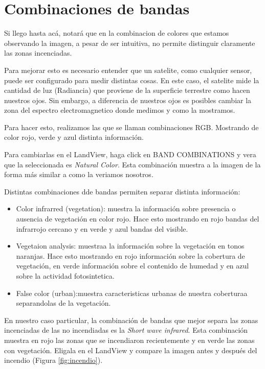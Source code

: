 \documentclass[a4paper,12pt]{book}
\begin{document}
\chapter{Combinaciones de bandas}
Si llego hasta acá, notará que en la combinacion de colores que estamos observando la imagen, a pesar de ser intuitiva, no permite distinguir claramente las zonas incenciadas.

Para mejorar esto es necesario entender que un satelite, como cualquier sensor, puede ser configurado para medir distintas cosas. En este caso, el satelite mide la cantidad de luz (Radiancia) que proviene de la superficie terrestre como hacen nuestros ojos. Sin embargo, a diferencia de nuestros ojos es posibles cambiar la zona del espectro electromagnetico donde medimos y como la mostramos.

Para hacer esto, realizamos las que se llaman combinaciones RGB. Mostrando de color rojo, verde y azul distinta información.

Para cambiarlas en el LandView, haga click en BAND COMBINATIONS y vera que la seleccionada es \emph{Natural Color}. Esta combinación muestra a la imagen de la forma más similar a como la veriamos nosotros.

Distintas combinaciones dde bandas permiten separar distinta información:

\begin{itemize}
    \item Color infrarred (vegetation): muestra la información sobre presencia o ausencia de vegetación en color rojo. Hace esto mostrando en rojo bandas del infrarrojo cercano y en verde y azul bandas del visible.
    \item Vegetaion analysis: muestraa la información sobre la vegetación en tonos naranjas. Hace esto mostrando en rojo información sobre la cobertura de vegetación, en verde información sobre el contenido de humedad y en azul sobre la actividad fotosintetica.
    \item False color (urban):muestra caracteristicas urbanas de nuestra coberturaa separandolas de la vegetación.
\end{itemize}

En nuestro caso particular, la combinación de bandas que mejor separa las zonas incenciadas de las no incendiadas es la \emph{Short wave infrared}. Esta combinación muestra en rojo las zonas que se incendiaron recientemente y en verde las zonas con vegetación. Eligala en el LandView y compare la imagen antes y después del incendio (Figura \ref{fig:incendio}).
\end{document}
